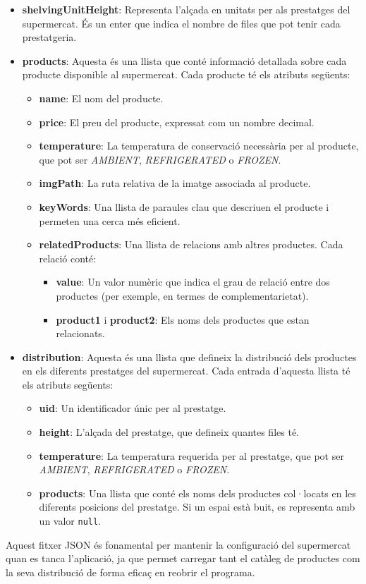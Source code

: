 \documentclass[a4paper,12pt]{report}
\begin{document}
	\begin{itemize}
		\item \textbf{shelvingUnitHeight}: Representa l'alçada en unitats per als prestatges del supermercat. És un enter que indica el nombre de files que pot tenir cada prestatgeria.
		
		\item \textbf{products}: Aquesta és una llista que conté informació detallada sobre cada producte disponible al supermercat. Cada producte té els atributs següents:
		\begin{itemize}
			\item \textbf{name}: El nom del producte.
			\item \textbf{price}: El preu del producte, expressat com un nombre decimal.
			\item \textbf{temperature}: La temperatura de conservació necessària per al producte, que pot ser \textit{AMBIENT}, \textit{REFRIGERATED} o \textit{FROZEN}.
			\item \textbf{imgPath}: La ruta relativa de la imatge associada al producte.
			\item \textbf{keyWords}: Una llista de paraules clau que descriuen el producte i permeten una cerca més eficient.
			\item \textbf{relatedProducts}: Una llista de relacions amb altres productes. Cada relació conté:
			\begin{itemize}
				\item \textbf{value}: Un valor numèric que indica el grau de relació entre dos productes (per exemple, en termes de complementarietat).
				\item \textbf{product1} i \textbf{product2}: Els noms dels productes que estan relacionats.
			\end{itemize}
		\end{itemize}
		
		\item \textbf{distribution}: Aquesta és una llista que defineix la distribució dels productes en els diferents prestatges del supermercat. Cada entrada d'aquesta llista té els atributs següents:
		\begin{itemize}
			\item \textbf{uid}: Un identificador únic per al prestatge.
			\item \textbf{height}: L'alçada del prestatge, que defineix quantes files té.
			\item \textbf{temperature}: La temperatura requerida per al prestatge, que pot ser \textit{AMBIENT}, \textit{REFRIGERATED} o \textit{FROZEN}.
			\item \textbf{products}: Una llista que conté els noms dels productes col·locats en les diferents posicions del prestatge. Si un espai està buit, es representa amb un valor \texttt{null}.
		\end{itemize}
	\end{itemize}
	
	Aquest fitxer JSON és fonamental per mantenir la configuració del supermercat quan es tanca l'aplicació, ja que permet carregar tant el catàleg de productes com la seva distribució de forma eficaç en reobrir el programa.
	

\end{document}
